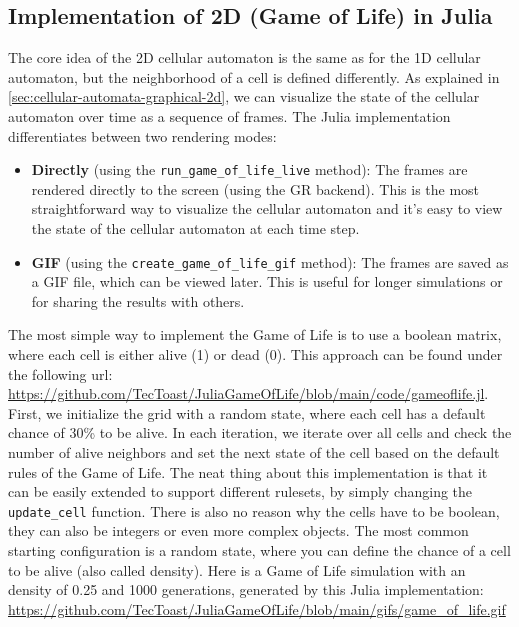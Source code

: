 \documentclass[a4paper,12pt]{llncs}
\numberwithin{equation}{section}
\begin{document}
\subsection{Implementation of 2D (Game of Life) in Julia}
The core idea of the 2D cellular automaton is the same as for the 1D cellular automaton, but the neighborhood of a cell is defined differently.
As explained in \autoref{sec:cellular-automata-graphical-2d}, we can visualize the state of the cellular automaton over time as a sequence of frames.
The Julia implementation differentiates between two rendering modes:
\begin{itemize}
  \item \textbf{Directly} (using the \texttt{run\_game\_of\_life\_live} method): The frames are rendered directly to the screen (using the GR backend). This is the most straightforward way to visualize the cellular automaton and it's easy to view the state of the cellular automaton at each time step.
  \item \textbf{GIF} (using the \texttt{create\_game\_of\_life\_gif} method): The frames are saved as a GIF file, which can be viewed later. This is useful for longer simulations or for sharing the results with others.
\end{itemize}
The most simple way to implement the Game of Life is to use a boolean matrix, where each cell is either alive (1) or dead (0).
This approach can be found under the following url: \url{https://github.com/TecToast/JuliaGameOfLife/blob/main/code/gameoflife.jl}.
First, we initialize the grid with a random state, where each cell has a default chance of 30\% to be alive.
In each iteration, we iterate over all cells and check the number of alive neighbors and set the next state of the cell based on the default rules of the Game of Life.
The neat thing about this implementation is that it can be easily extended to support different rulesets, by simply changing the \texttt{update\_cell} function.
There is also no reason why the cells have to be boolean, they can also be integers or even more complex objects.
The most common starting configuration is a random state, where you can define the chance of a cell to be alive (also called density).
Here is a Game of Life simulation with an density of 0.25 and 1000 generations, generated by this Julia implementation: \url{https://github.com/TecToast/JuliaGameOfLife/blob/main/gifs/game_of_life.gif}
\end{document}
